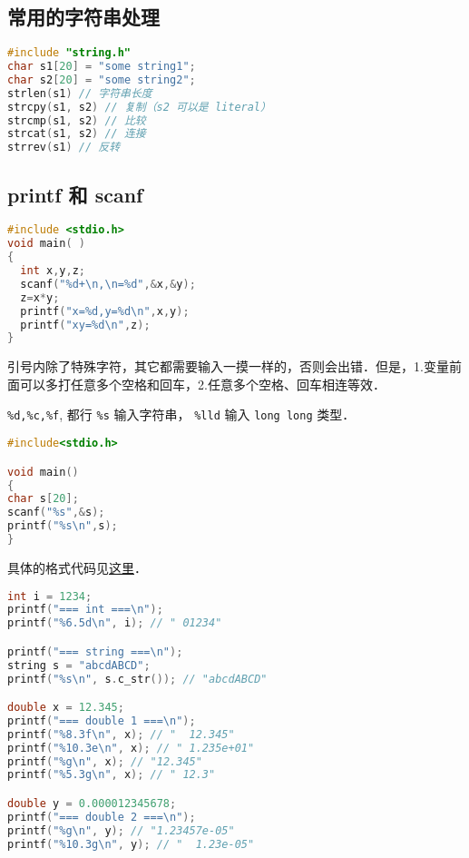 

\begin{issues}
\issueDraft
\end{issues}

\subsection{常用的字符串处理}
\begin{lstlisting}[language=cpp]
#include "string.h"
char s1[20] = "some string1";
char s2[20] = "some string2";
strlen(s1) // 字符串长度
strcpy(s1, s2) // 复制（s2 可以是 literal）
strcmp(s1, s2) // 比较
strcat(s1, s2) // 连接
strrev(s1) // 反转
\end{lstlisting}

\subsection{printf 和 scanf}
\begin{lstlisting}[language=cpp]
#include <stdio.h>
void main( )
{
  int x,y,z;
  scanf("%d+\n,\n=%d",&x,&y);
  z=x*y;
  printf("x=%d,y=%d\n",x,y);
  printf("xy=%d\n",z);
}
\end{lstlisting}
引号内除了特殊字符，其它都需要输入一摸一样的，否则会出错．但是，1.变量前面可以多打任意多个空格和回车，2.任意多个空格、回车相连等效．
 
\verb|%d,%c,%f|, 都行 \verb|%s| 输入字符串， \verb|%lld| 输入 \verb|long long| 类型．

\begin{lstlisting}[language=cpp]
#include<stdio.h>

void main()
{
char s[20];
scanf("%s",&s);
printf("%s\n",s);
}
\end{lstlisting}
具体的格式代码见\href{https://www.tutorialspoint.com/c_standard_library/c_function_printf.htm}{这里}．

\begin{lstlisting}[language=cpp]
int i = 1234;
printf("=== int ===\n");
printf("%6.5d\n", i); // " 01234"

printf("=== string ===\n");
string s = "abcdABCD";
printf("%s\n", s.c_str()); // "abcdABCD"

double x = 12.345;
printf("=== double 1 ===\n");
printf("%8.3f\n", x); // "  12.345"
printf("%10.3e\n", x); // " 1.235e+01"
printf("%g\n", x); // "12.345"
printf("%5.3g\n", x); // " 12.3"

double y = 0.000012345678;
printf("=== double 2 ===\n");
printf("%g\n", y); // "1.23457e-05"
printf("%10.3g\n", y); // "  1.23e-05"
\end{lstlisting}

